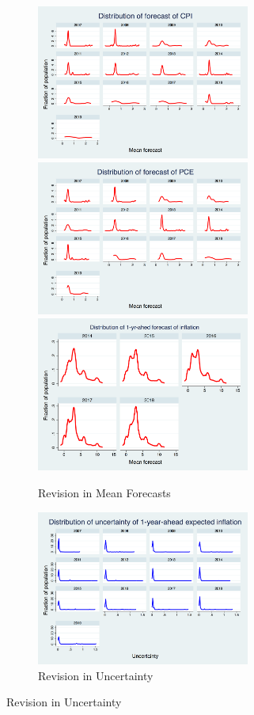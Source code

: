 \documentclass[12pt]{article}
\begin{document}
	
	\begin{figure}[ht]
		\begin{subfigure}[b]{0.5\textwidth}
		\centering
		\caption{Revision in Mean Forecasts}
		\includegraphics[width=7cm]{figures/PRCCPIMean1_hist.png} 
		\smallskip
		\includegraphics[width=7cm]{figures/PRCPCEMean1_hist.png} 
		\smallskip
		\includegraphics[width=7cm]{figures/SCEmean_hist.png} 
		\end{subfigure}
	   \hfill 
	  	\begin{subfigure}[b]{0.5\textwidth}
	  	\caption{Revision in Uncertainty}
		\includegraphics[width=7cm]{figures/PRCCPIVar1_hist.png}  

\end{subfigure}
\end{figure}
\end{document}
